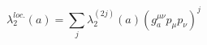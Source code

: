 \begin{equation}
\lambda^{loc.}_2(a)=\sum_j \lambda_2^{(2j)}(a)(g_a^{\mu\nu} p_\mu
p_\nu)^j
\end{equation}

